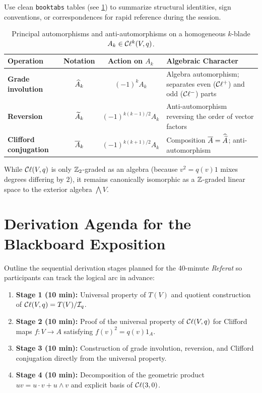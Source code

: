 \documentclass[11pt,a4paper]{article}
\begin{document}
Use clean \texttt{booktabs} tables (see \cref{tab:involutions}) to summarize
structural identities, sign conventions, or correspondences for rapid
reference during the session.

\begin{table}[htbp]
  \centering
  \caption{Principal automorphisms and anti-automorphisms on a homogeneous
    $k$-blade $A_k \in \mathcal{C}\ell^k(V, q)$.}
  \label{tab:involutions}
  \small
  \renewcommand{\arraystretch}{1.22}
  \begin{tabularx}{\textwidth}{@{} >{\bfseries}l c c >{\raggedright\arraybackslash}X @{}}
    \toprule
    \textbf{Operation} & \textbf{Notation} & \textbf{Action on $A_k$} & \textbf{Algebraic Character} \\
    \midrule
    Grade involution & $\widehat{A}_k$ & $(-1)^k A_k$ &
      Algebra automorphism; separates even ($\mathcal{C}\ell^+$) and odd ($\mathcal{C}\ell^-$) parts \\
    Reversion & $\widetilde{A}_k$ & $(-1)^{k(k-1)/2} A_k$ &
      Anti-automorphism reversing the order of vector factors \\
    Clifford conjugation & $\overline{A}_k$ & $(-1)^{k(k+1)/2} A_k$ &
      Composition $\overline{A} = \widehat{\widetilde{A}}$; anti-automorphism \\
    \bottomrule
  \end{tabularx}
\end{table}

\begin{remark}
  While $\mathcal{C}\ell(V, q)$ is only $\mathbb{Z}_2$-graded as an algebra (because $v^2 = q(v)1$
  mixes degrees differing by $2$), it remains canonically isomorphic as a
  $\mathbb{Z}$-graded linear space to the exterior algebra $\bigwedge V$.
\end{remark}

\section{Derivation Agenda for the Blackboard Exposition}
\label{sec:agenda}

Outline the sequential derivation stages planned for the 40-minute
\emph{Referat} so participants can track the logical arc in advance:
\begin{enumerate}
  \item \textbf{Stage 1 (10 min):} Universal property of $T(V)$ and quotient
    construction of $\mathcal{C}\ell(V, q) = T(V)/\mathcal{I}_q$.
  \item \textbf{Stage 2 (10 min):} Proof of the universal property of
    $\mathcal{C}\ell(V, q)$ for Clifford maps $f : V \to A$ satisfying $f(v)^2 = q(v)1_A$.
  \item \textbf{Stage 3 (10 min):} Construction of grade involution,
    reversion, and Clifford conjugation directly from the universal property.
  \item \textbf{Stage 4 (10 min):} Decomposition of the geometric product
    $uv = u \cdot v + u \wedge v$ and explicit basis of $\mathcal{C}\ell(3,0)$.
\end{enumerate}
\end{document}
